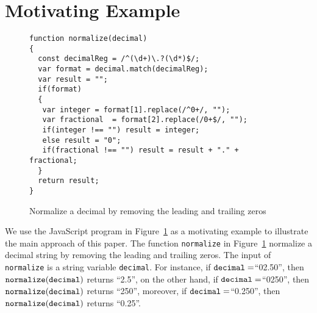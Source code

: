 
\section{Motivating Example}\label{sec:mot}

\begin{figure}[htbp]
\begin{center}
\begin{verbatim}
function normalize(decimal)
{
  const decimalReg = /^(\d+)\.?(\d*)$/;
  var format = decimal.match(decimalReg);
  var result = "";
  if(format)
  {
   var integer = format[1].replace(/^0+/, "");
   var fractional  = format[2].replace(/0+$/, "");
   if(integer !== "") result = integer;
   else result = "0"; 
   if(fractional !== "") result = result + "." + fractional;
  }
  return result;
}
\end{verbatim}
\end{center}
\caption{Normalize a decimal by removing the leading and trailing zeros}
\label{fig-run-exmp}
\end{figure}

We use the JavaScript program in Figure~\ref{fig-run-exmp} as a motivating example to illustrate the main approach of this paper. 
The function {\tt normalize}  in Figure~\ref{fig-run-exmp} normalize a decimal string by removing the leading and trailing zeros. The input of {\tt normalize} is a string variable {\tt decimal}. For instance,  if $\tt{decimal} =$``02.50'', then $\tt{normalize(decimal)}$ returns ``2.5'', on the other hand, if $\tt{decimal} =$``0250'', then $\tt{normalize(decimal)}$ returns ``250'', moreover, if $\tt{decimal} =$``0.250'', then $\tt{normalize(decimal)}$ returns ``0.25''. 


